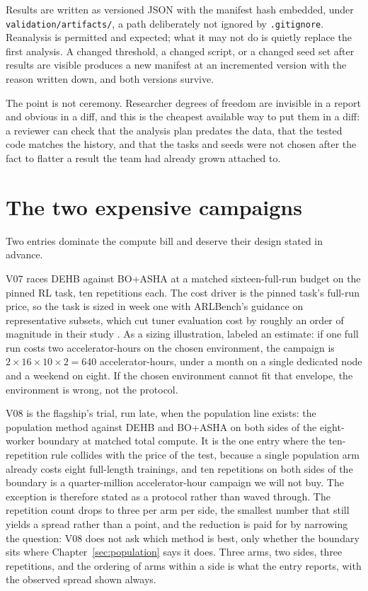 Results are written as versioned JSON with the manifest hash
embedded, under \texttt{validation/artifacts/}, a path deliberately
not ignored by \texttt{.gitignore}. Reanalysis is permitted and
expected; what it may not do is quietly replace the first analysis. A
changed threshold, a changed script, or a changed seed set after
results are visible produces a new manifest at an incremented version
with the reason written down, and both versions survive.

The point is not ceremony. Researcher degrees of freedom
\citep{simmons2011false} are invisible in a report and obvious in a
diff, and this is the cheapest available way to put them in a diff: a
reviewer can check that the analysis plan predates the data, that the
tested code matches the history, and that the tasks and seeds were
not chosen after the fact to flatter a result the team had already
grown attached to.

\section{The two expensive campaigns}
\label{sec:val-v08}

Two entries dominate the compute bill and deserve their design
stated in advance.

V07 races DEHB against BO+ASHA at a matched sixteen-full-run budget
on the pinned RL task, ten repetitions each. The cost driver is the
pinned task's full-run price, so the task is sized in week one with
ARLBench's guidance on representative subsets, which cut tuner
evaluation cost by roughly an order of magnitude in their study
\citep{becktepe2024arlbench}. As a sizing illustration, labeled an
estimate: if one full run costs two accelerator-hours on the chosen
environment, the campaign is $2 \times 16 \times 10 \times 2 = 640$
accelerator-hours, under a month on a single dedicated node and a
weekend on eight. If the chosen environment cannot fit that
envelope, the environment is wrong, not the protocol.

V08 is the flagship's trial, run late, when the population line
exists: the population method against DEHB and BO+ASHA on both sides
of the eight-worker boundary at matched total compute. It is the one
entry where the ten-repetition rule collides with the price of the
test, because a single population arm already costs eight
full-length trainings, and ten repetitions on both sides of the
boundary is a quarter-million accelerator-hour campaign we will not
buy. The exception is therefore stated as a protocol rather than
waved through. The repetition count drops to three per arm per side,
the smallest number that still yields a spread rather than a point,
and the reduction is paid for by narrowing the question: V08 does not
ask which method is best, only whether the boundary sits where
Chapter~\ref{sec:population} says it does. Three arms, two sides,
three repetitions, and the ordering of arms within a side is what the
entry reports, with the observed spread shown always.

